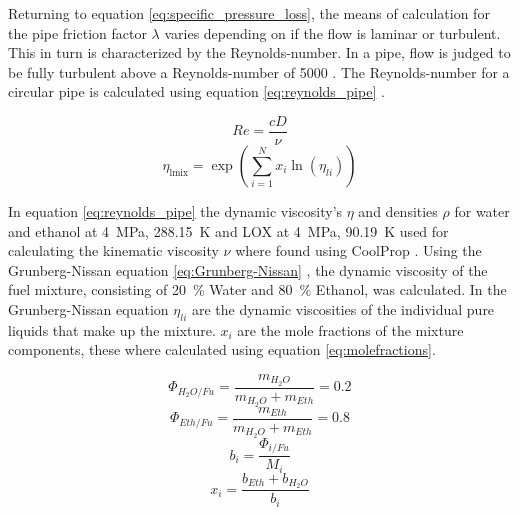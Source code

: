                 Returning to equation \ref{eq:specific_pressure_loss}, the means of calculation for the pipe friction factor $\lambda$ varies depending on if the flow is laminar or turbulent. This in turn is characterized by the Reynolds-number. In a pipe, flow is judged to be fully turbulent above a Reynolds-number of \num{5000} \cite[120]{Paschereit:2022}. The Reynolds-number for a circular pipe is calculated using equation \ref{eq:reynolds_pipe} \cite[629]{Paschereit:2022}.
                 \begin{multicols}{2}
                    \begin{equation}
                        Re = \frac{cD}{\nu}  \label{eq:reynolds_pipe} 
                    \end{equation}
                    \begin{equation}
                        \eta_{\text{lmix}} = \exp\left(\sum_{i=1}^{N} x_{i} \ln( \eta_{li})\right)  \label{eq:Grunberg-Nissan}
                    \end{equation}
                \end{multicols}
                In equation \ref{eq:reynolds_pipe} the dynamic viscosity's $\eta$ and densities $\rho$ for water and ethanol at \qty{4}{MPa}, \qty{288.15}{K} and LOX at \qty{4}{MPa}, \qty{90.19}{K} used for calculating the kinematic viscosity $\nu$ where found using CoolProp \cite{coolprop_article}. Using the Grunberg-Nissan equation \ref{eq:Grunberg-Nissan} \cite{Grunberg-Nissan}, the dynamic viscosity of the fuel mixture, consisting of \qty{20}{\%} Water and \qty{80}{\%} Ethanol, was calculated. In the Grunberg-Nissan equation $\eta_{li}$ are the dynamic viscosities of the individual pure liquids that make up the mixture. $x_i$ are the mole fractions of the mixture components, these where calculated using equation \ref{eq:molefractions}. 
                \begin{multicols}{2}
                    \begin{equation}
                        \Phi_{H_2O/Fu} = \frac{m_{H_2O}}{m_{H_2O}+ m_{Eth}}  \label{eq:massfraction_H2O_Fu} = 0.2
                    \end{equation}
                    \begin{equation}
                        \Phi_{Eth/Fu} = \frac{m_{Eth}}{m_{H_2O}+ m_{Eth}}  \label{eq:massfraction_Eht_Fu} = 0.8
                    \end{equation}
                    \begin{equation}
                        b_i = \frac{\Phi_{i/Fu}}{M_i} \label{eq:molalitys}
                    \end{equation}
                    \begin{equation}
                        x_i = \frac{b_{Eth} + b_{H_2O}}{b_i}  \label{eq:molefractions}
                    \end{equation}
                \end{multicols}
